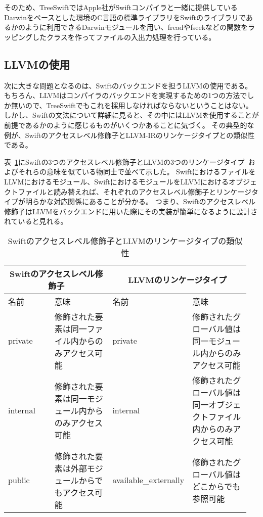 そのため、TreeSwiftではApple社がSwiftコンパイラと一緒に提供しているDarwinをベースとした環境のC言語の標準ライブラリをSwiftのライブラリであるかのように利用できるDarwinモジュールを用い、freadやfseekなどの関数をラッピングしたクラスを作ってファイルの入出力処理を行っている。

\subsection{LLVMの使用}

次に大きな問題となるのは、Swiftのバックエンドを担うLLVMの使用である。
もちろん、LLVMはコンパイラのバックエンドを実現するための1つの方法でしか無いので、TreeSwiftでもこれを採用しなければならないということはない。
しかし、Swiftの文法について詳細に見ると、その中にはLLVMを使用することが前提であるかのように感じるものがいくつかあることに気づく。
その典型的な例が、Swiftのアクセスレベル修飾子とLLVM-IRのリンケージタイプとの類似性である。

表~\ref{table:linkage-access-level}にSwiftの3つのアクセスレベル修飾子とLLVMの3つのリンケージタイプ~\cite{llvm-man}およびそれらの意味を似ている物同士で並べて示した。
SwiftにおけるファイルをLLVMにおけるモジュール、SwiftにおけるモジュールをLLVMにおけるオブジェクトファイルと読み替えれば、それぞれのアクセスレベル修飾子とリンケージタイプが明らかな対応関係にあることが分かる。
つまり、Swiftのアクセスレベル修飾子はLLVMをバックエンドに用いた際にその実装が簡単になるように設計されていると見れる。

\begin{table}[!hbtp]
    \begin{center}
        \caption{Swiftのアクセスレベル修飾子とLLVMのリンケージタイプの類似性}
        \begin{tabular}{|p{0.2\linewidth}|p{0.275\linewidth}||p{0.2\linewidth}|p{0.275\linewidth}|}
            \hline
            \multicolumn{2}{|c||}{Swiftのアクセスレベル修飾子} & \multicolumn{2}{|c|}{LLVMのリンケージタイプ}\\
            \hline
            名前 & 意味 & 名前 & 意味\\
            \hline
            \hline
            private & 修飾された要素は同一ファイル内からのみアクセス可能 & private & 修飾されたグローバル値は同一モジュール内からのみアクセス可能\\
            \hline
            internal & 修飾された要素は同一モジュール内からのみアクセス可能 & internal & 修飾されたグローバル値は同一オブジェクトファイル内からのみアクセス可能\\
            \hline
            public & 修飾された要素は外部モジュールからでもアクセス可能 & available\_externally& 修飾されたグローバル値はどこからでも参照可能\\
            \hline
        \end{tabular}
        \label{table:linkage-access-level}
    \end{center}
\end{table}

